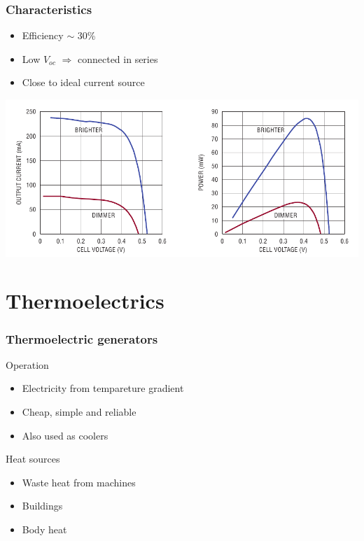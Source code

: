 \documentclass{beamer}
\begin{document}
\begin{frame}
  \frametitle{Characteristics}
  \begin{itemize}
    \item Efficiency $\sim$ 30\%
    \item Low $V_{oc}$ $\Rightarrow$ connected in series
    \item Close to ideal current source
  \end{itemize}
\includegraphics[width=\textwidth]{./Slike/PV-power-curve}


\end{frame}

\section{Thermoelectrics}

\begin{frame}
  \frametitle{Thermoelectric generators}
\begin{block}{Operation}
\begin{itemize}
  \item Electricity from tempareture gradient
  \item Cheap, simple and reliable
  \item Also used as coolers
\end{itemize}
\end{block}

\begin{block}{Heat sources}
  \begin{itemize}
    \item Waste heat from machines
    \item Buildings
    \item Body heat
  \end{itemize}
\end{block}


\end{frame}
\end{document}
